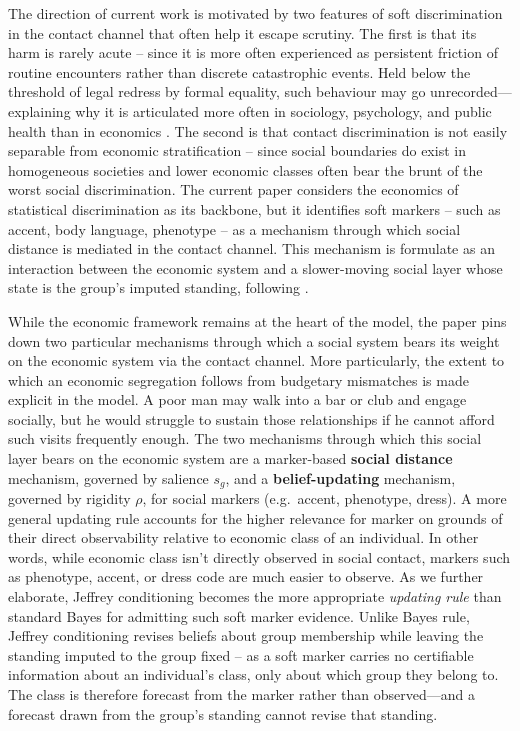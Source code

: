 \documentclass[pdflatex,sn-basic]{sn-jnl}
\theoremstyle{thmstyleone}
\numberwithin{proposition}{subsection}
\begin{document}
The direction of current work is motivated by two features of soft discrimination in the contact channel that often help it escape scrutiny. The first is that its harm is rarely acute -- since it is more often experienced as persistent friction of routine encounters rather than discrete catastrophic events. Held below the threshold of legal redress by formal equality, such behaviour may go unrecorded--- explaining why it is articulated more often in sociology, psychology, and public health than in economics \citep{WilliamsYuJacksonAnderson1997,SueCapodilupoTorinoBucceriHolderNadalEsquilin2007}. The second is that contact discrimination is not easily separable from economic stratification -- since social boundaries do exist in homogeneous societies and lower economic classes often bear the brunt of the worst social discrimination. The current paper considers the economics of statistical discrimination as its backbone, but it identifies soft markers -- such as accent, body language, phenotype -- as a mechanism through which social distance is mediated in the contact channel. This mechanism is formulate as an interaction between the economic system and a slower-moving social layer whose state is the group's imputed standing, following \citet{ColeMailathPostlewaite1992}.


While the economic framework remains at the heart of the model, the paper pins down two particular mechanisms through which a social system bears its weight on the economic system via the contact channel. More particularly, the extent to which an economic segregation follows from budgetary mismatches is made explicit in the model. A poor man may walk into a bar or club and engage socially, but he would struggle to sustain those relationships if he cannot afford such visits frequently enough. The two mechanisms through which this social layer bears on the economic system are a marker-based \textbf{social distance} mechanism, governed by salience $s_g$, and a \textbf{belief-updating} mechanism, governed by rigidity $\rho$, for social markers (e.g.\ accent, phenotype, dress). A more general updating rule accounts for the higher relevance for marker on grounds of their direct observability relative to economic class of an individual. In other words, while economic class isn't directly observed in social contact, markers such as phenotype, accent, or dress code are much easier to observe. As we further elaborate, Jeffrey conditioning becomes the more appropriate \emph{updating rule} than standard Bayes for admitting such soft marker evidence. Unlike Bayes rule, Jeffrey conditioning revises beliefs about group membership while leaving the standing imputed to the group fixed -- as a soft marker carries no certifiable information about an individual's class, only about which group they belong to. The class is therefore forecast from the marker rather than observed---and a forecast drawn from the group's standing cannot revise that standing.
\end{document}
